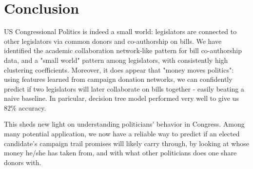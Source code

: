 \documentclass[12pt,twocolumn]{article}
\begin{document}
\section{Conclusion}
US Congressional Politics is indeed a small world: legislators are connected to other legislators via common donors and co-authorship on bills. We have identified the academic collaboration network-like pattern for bill co-authorship data, and a "small world" pattern among legislators, with consistently high clustering coefficients. Moreover, it does appear that "money moves politics": using features learned from campaign donation networks, we can confidently predict if two legislators will later collaborate on bills together - easily beating a naive baseline. In paricular, decision tree model performed very well to give us $82\%$ accuracy. 

This sheds new light on understanding politicians' behavior in Congress. Among many potential application, we now have a reliable way to predict if an elected candidate's campaign trail promises will likely carry through, by looking at whose money he/she has taken from, and with what other politicians does one share donors with. 




\end{document}
